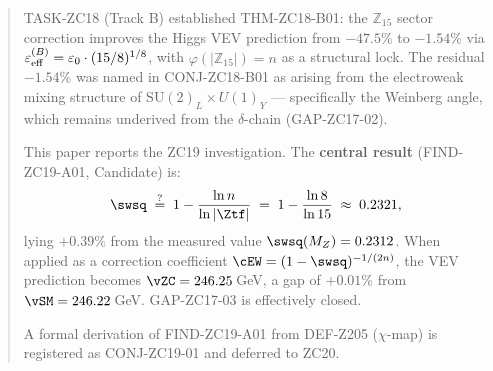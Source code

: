 \documentclass[12pt, a4paper]{article}
\begin{document}


\begin{abstract}
\sloppy
TASK-ZC18 (Track B) established THM-ZC18-B01: the $\mathbb{Z}_{15}$
sector correction improves the Higgs VEV prediction from $-47.5\%$
to $-1.54\%$ via $\varepsilon_{\rm eff}^{(B)}
= \varepsilon_0\cdot(15/8)^{1/8}$,
with $\varphi(|\mathbb{Z}_{15}|) = n$ as a structural lock.
The residual $-1.54\%$ was named in CONJ-ZC18-B01 as arising from the
electroweak mixing structure of $\mathrm{SU}(2)_L\times U(1)_Y$
--- specifically the Weinberg angle, which remains underived from the
$\delta$-chain (GAP-ZC17-02).

This paper reports the ZC19 investigation.
The \textbf{central result} (FIND-ZC19-A01, Candidate) is:
\[
  \swsq \;\stackrel{?}{=}\; 1 - \frac{\ln n}{\ln|\Ztf|}
  \;=\; 1 - \frac{\ln 8}{\ln 15} \;\approx\; 0.2321,
\]
lying $+0.39\%$ from the measured value $\swsq(M_Z) = 0.2312$.
When applied as a correction coefficient
$\cEW = (1-\swsq)^{-1/(2n)}$,
the VEV prediction becomes $\vZC = 246.25$\,GeV,
a gap of $+0.01\%$ from $\vSM = 246.22$\,GeV.
GAP-ZC17-03 is effectively closed.

A formal derivation of FIND-ZC19-A01 from DEF-Z205 ($\chi$-map)
is registered as CONJ-ZC19-01 and deferred to ZC20.
\end{abstract}
\end{document}
